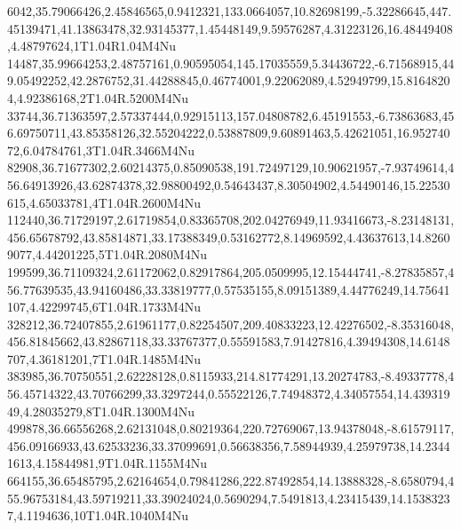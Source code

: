 6042,35.79066426,2.45846565,0.9412321,133.0664057,10.82698199,-5.32286645,447.45139471,41.13863478,32.93145377,1.45448149,9.59576287,4.31223126,16.48449408,4.48797624,1T1.04R1.04M4Nu
14487,35.99664253,2.48757161,0.90595054,145.17035559,5.34436722,-6.71568915,449.05492252,42.2876752,31.44288845,0.46774001,9.22062089,4.52949799,15.81648204,4.92386168,2T1.04R.5200M4Nu
33744,36.71363597,2.57337444,0.92915113,157.04808782,6.45191553,-6.73863683,456.69750711,43.85358126,32.55204222,0.53887809,9.60891463,5.42621051,16.95274072,6.04784761,3T1.04R.3466M4Nu
82908,36.71677302,2.60214375,0.85090538,191.72497129,10.90621957,-7.93749614,456.64913926,43.62874378,32.98800492,0.54643437,8.30504902,4.54490146,15.22530615,4.65033781,4T1.04R.2600M4Nu
112440,36.71729197,2.61719854,0.83365708,202.04276949,11.93416673,-8.23148131,456.65678792,43.85814871,33.17388349,0.53162772,8.14969592,4.43637613,14.82609077,4.44201225,5T1.04R.2080M4Nu
199599,36.71109324,2.61172062,0.82917864,205.0509995,12.15444741,-8.27835857,456.77639535,43.94160486,33.33819777,0.57535155,8.09151389,4.44776249,14.75641107,4.42299745,6T1.04R.1733M4Nu
328212,36.72407855,2.61961177,0.82254507,209.40833223,12.42276502,-8.35316048,456.81845662,43.82867118,33.33767377,0.55591583,7.91427816,4.39494308,14.6148707,4.36181201,7T1.04R.1485M4Nu
383985,36.70750551,2.62228128,0.8115933,214.81774291,13.20274783,-8.49337778,456.45714322,43.70766299,33.3297244,0.55522126,7.74948372,4.34057554,14.43931949,4.28035279,8T1.04R.1300M4Nu
499878,36.66556268,2.62131048,0.80219364,220.72769067,13.94378048,-8.61579117,456.09166933,43.62533236,33.37099691,0.56638356,7.58944939,4.25979738,14.23441613,4.15844981,9T1.04R.1155M4Nu
664155,36.65485795,2.62164654,0.79841286,222.87492854,14.13888328,-8.6580794,455.96753184,43.59719211,33.39024024,0.5690294,7.5491813,4.23415439,14.15383237,4.1194636,10T1.04R.1040M4Nu

